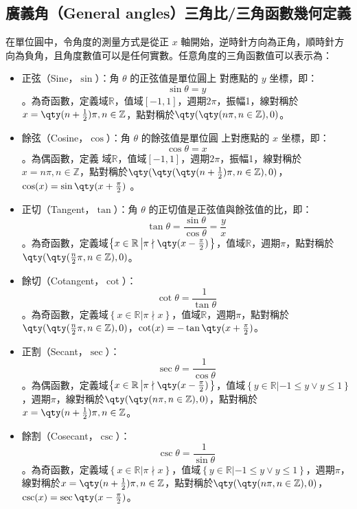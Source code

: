 \documentclass[a4paper,12pt]{report}
\begin{document}
\subsection{廣義角（General angles）三角比/三角函數幾何定義}
在單位圓中，令角度的測量方式是從正 \(x\) 軸開始，逆時針方向為正角，順時針方向為負角，且角度數值可以是任何實數。任意角度的三角函數值可以表示為：
\begin{itemize}
  \item 正弦（Sine，$\sin$）：角 \(\theta\) 的正弦值是單位圓上 對應點的 \(y\) 坐標，即：\[\sin \theta = y\]。為奇函數，定義域$\mathbb{R}$，值域$[-1,1]$，週期$2\pi$，振幅1，線對稱於$x=\qty(n+\frac{1}{2})\pi,n\in\mathbb{Z}$，點對稱於$\qty(\qty(n\pi,n\in\mathbb{Z}),0)$。
  \item 餘弦（Cosine，$\cos$）：角 \(\theta\) 的餘弦值是單位圓 上對應點的 \(x\) 坐標，即：\[\cos \theta = x\]。為偶函數，定義 域$\mathbb{R}$，值域$[-1,1]$，週期$2\pi$，振幅1，線對稱於$x=n\pi,n\in\mathbb{Z}$，點對稱於$\qty(\qty(\qty(n+\frac{1}{2})\pi,n\in\mathbb{Z}),0)$，$\cos(x)=\sin\qty(x+\frac{\pi}{2})$ 。
  \item 正切（Tangent，$\tan$）：角 \(\theta\) 的正切值是正弦值與餘弦值的比，即：\[\tan \theta = \frac{\sin \theta}{\cos \theta} = \frac{y}{x}\]。為奇函數，定義域$\left\{x\in\mathbb{R}\left |\pi\nmid\qty(x-\frac{\pi}{2})\right.\right\}$，值域$\mathbb{R}$，週期$\pi$，點對稱於$\qty(\qty(\frac{n}{2}\pi,n\in\mathbb{Z}),0)$。
  \item 餘切（Cotangent，$\cot$）：\[\cot \theta = \frac{1}{\tan \theta}\]。為奇函數，定義域$\left\{x\in\mathbb{R}\left |\pi\nmid x\right.\right\}$，值域$\mathbb{R}$，週期$\pi$，點對稱於$\qty(\qty(\frac{n}{2}\pi,n\in\mathbb{Z}),0)$，$\cot(x)=-\tan\qty(x+\frac{\pi}{2})$。
  \item 正割（Secant，$\sec$）：\[\sec \theta = \frac{1}{\cos \theta}\]。為偶函數，定義域$\left\{x\in\mathbb{R}\left |\pi\nmid\qty(x-\frac{\pi}{2})\right.\right\}$，值域$\left\{y\in\mathbb{R}\left |-1\leq y \lor y\leq 1\right.\right\}$，週期$\pi$，線對稱於$\qty(\qty(n\pi,n\in\mathbb{Z}),0)$，點對稱於$x=\qty(n+\frac{1}{2})\pi,n\in\mathbb{Z}$。
  \item 餘割（Cosecant，$\csc$）：\[\csc \theta = \frac{1}{\sin \theta}\]。為奇函數，定義域$\left\{x\in\mathbb{R}\left |\pi\nmid x\right.\right\}$，值域$\left\{y\in\mathbb{R}\left |-1\leq y \lor y\leq 1\right.\right\}$，週期$\pi$，線對稱於$x=\qty(n+\frac{1}{2})\pi,n\in\mathbb{Z}$，點對稱於$\qty(\qty(n\pi,n\in\mathbb{Z}),0)$，$\csc(x)=\sec\qty(x-\frac{\pi}{2})$。
\end{itemize}
\end{document}
